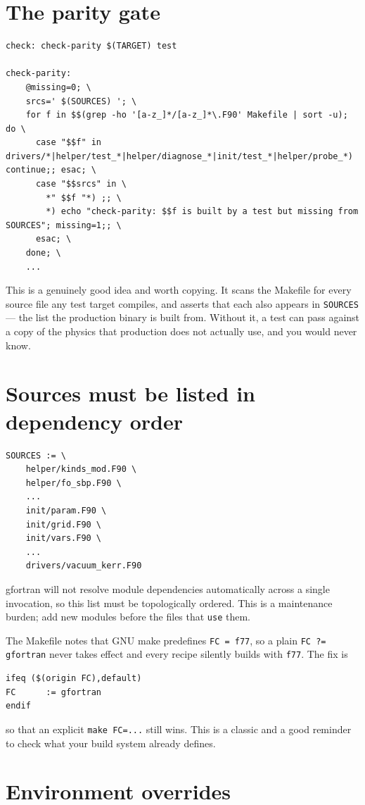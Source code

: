 \documentclass[11pt,openany]{book}
\begin{document}
\section{The parity gate}

\begin{lstlisting}
check: check-parity $(TARGET) test

check-parity:
	@missing=0; \
	srcs=' $(SOURCES) '; \
	for f in $$(grep -ho '[a-z_]*/[a-z_]*\.F90' Makefile | sort -u); do \
	  case "$$f" in drivers/*|helper/test_*|helper/diagnose_*|init/test_*|helper/probe_*) continue;; esac; \
	  case "$$srcs" in \
	    *" $$f "*) ;; \
	    *) echo "check-parity: $$f is built by a test but missing from SOURCES"; missing=1;; \
	  esac; \
	done; \
	...
\end{lstlisting}

This is a genuinely good idea and worth copying. It scans the Makefile for
every source file any test target compiles, and asserts that each also appears
in \texttt{SOURCES} --- the list the production binary is built from. Without
it, a test can pass against a copy of the physics that production does not
actually use, and you would never know.

\section{Sources must be listed in dependency order}

\begin{lstlisting}
SOURCES := \
	helper/kinds_mod.F90 \
	helper/fo_sbp.F90 \
	...
	init/param.F90 \
	init/grid.F90 \
	init/vars.F90 \
	...
	drivers/vacuum_kerr.F90
\end{lstlisting}

gfortran will not resolve module dependencies automatically across a single
invocation, so this list must be topologically ordered. This is a maintenance
burden; add new modules before the files that \texttt{use} them.

\gotcha
The Makefile notes that GNU make predefines \texttt{FC = f77}, so a plain
\texttt{FC ?= gfortran} never takes effect and every recipe silently builds
with \texttt{f77}. The fix is
\begin{lstlisting}
ifeq ($(origin FC),default)
FC      := gfortran
endif
\end{lstlisting}
so that an explicit \texttt{make FC=...} still wins. This is a classic and a
good reminder to check what your build system already defines.

\section{Environment overrides}
\end{document}
